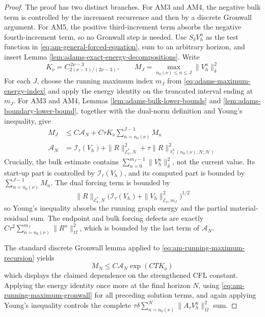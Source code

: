 \documentclass[10pt,a4paper]{amsart}
\begin{document}
\begin{proof}
The proof has two distinct branches. For AM3 and AM4, the negative bulk term
is controlled by the increment recurrence and then by a discrete Gronwall
argument. For AM5, the positive third-increment term absorbs the negative
fourth-increment term, so no Gronwall step is needed.
Use \(S_{\delta}V_h^n\) as the test function in
\eqref{eq:am-general-forced-equation}, sum to an arbitrary horizon, and
insert Lemma \ref{lem:adams-exact-energy-decompositions}. Write
\begin{equation}
K_\nu=C_{2(\nu-1)/(2\nu-3)}^{\,2\nu-3},\qquad
M_J=\max_{n_0(\nu)\le n\le J}\|V_h^n\|_{\delta}^2
\label{eq:am-gronwall-quantities}
\end{equation}
For each \(J\), choose the running maximum index \(m_J\) from
\eqref{eq:adams-maximum-energy-index} and apply the energy identity on the
truncated interval ending at \(m_J\). For AM3 and AM4, Lemmas
\ref{lem:adams-bulk-lower-bounds} and
\ref{lem:adams-boundary-lower-bound}, together with the dual-norm definition
and Young's inequality, give
\begin{align}
M_J
&\le C\mathcal A_N
+C\tau K_\nu\sum_{n=n_0(\nu)}^{J-1}M_n
\label{eq:am-running-maximum-recursion}\\
\mathcal A_N
&=\mathcal I_{\tau}(V_h)+\|R\|_{\mathcal E_\nu^*,N}^2
+\tau\|R\|_{\ell_{\tau}^2(n_0(\nu),N;\mathcal H)}^2
\label{eq:am-stability-data-quantity}
\end{align}
Crucially, the bulk estimate contains
\(\sum_{n=0}^{m_J-1}\|V_h^n\|_{\delta}^2\), not the current value. Its
start-up part is controlled by \(\mathcal I_{\tau}(V_h)\), and its computed
part is bounded by \(\sum_{n=n_0(\nu)}^{J-1}M_n\). The dual forcing term is
bounded by
\begin{equation}
\|R\|_{\mathcal E_\nu^*,N}
\bigl(\mathcal I_{\tau}(V_h)
+\|V_h\|_{\mathcal E_\nu,m_J}^2\bigr)^{1/2}
\label{eq:am-dual-forcing-at-running-maximum}
\end{equation}
so Young's inequality absorbs the running graph energy and the partial
material-residual sum. The endpoint and bulk forcing defects are exactly
\(C\tau^2\sum_{n=n_0(\nu)}^{m_J}\|R^n\|_{\Omega}^2\), which is bounded by the
last term of \(\mathcal A_N\).

The standard discrete Gronwall lemma applied to
\eqref{eq:am-running-maximum-recursion} yields
\begin{equation}
M_N\le C\mathcal A_N\exp(C T K_\nu)
\label{eq:am-running-maximum-gronwall}
\end{equation}
which displays the claimed dependence on the strengthened CFL constant.
Applying the energy identity once more at the final horizon \(N\), using
\eqref{eq:am-running-maximum-gronwall} for all preceding solution terms, and
again applying Young's inequality controls the complete
\(\tau\delta\sum_{n=n_0(\nu)}^N\|A_{\tau}V_h^n\|_{\Omega}^2\) sum.


\end{proof}
\end{document}

